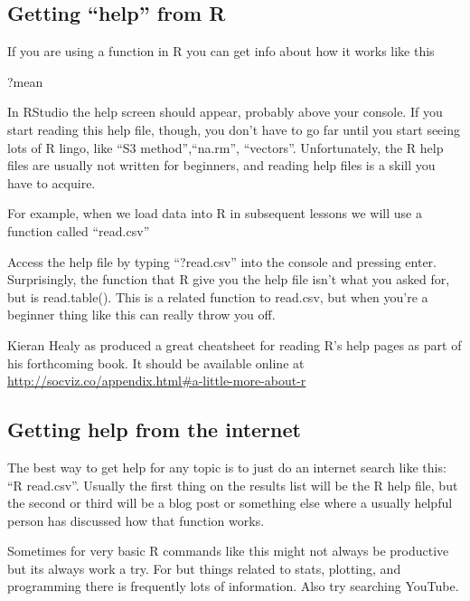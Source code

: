 \documentclass[
]{book}
\newenvironment{Shaded}{\begin{snugshade}}{\end{snugshade}}
\newcommand{\NormalTok}[1]{#1}
\begin{document}
\hypertarget{getting-help-from-r}{%
\subsection{Getting ``help'' from R}\label{getting-help-from-r}}

If you are using a function in R you can get info about how it works like this

\begin{Shaded}
\begin{Highlighting}[]
\NormalTok{?mean}
\end{Highlighting}
\end{Shaded}

In RStudio the help screen should appear, probably above your console. If you start reading this help file, though, you don't have to go far until you start seeing lots of R lingo, like ``S3 method'',``na.rm'', ``vectors''. Unfortunately, the R help files are usually not written for beginners, and reading help files is a skill you have to acquire.

For example, when we load data into R in subsequent lessons we will use a function called ``read.csv''

Access the help file by typing ``?read.csv'' into the console and pressing enter. Surprisingly, the function that R give you the help file isn't what you asked for, but is read.table(). This is a related function to read.csv, but when you're a beginner thing like this can really throw you off.

Kieran Healy as produced a great cheatsheet for reading R's help pages as part of his forthcoming book. It should be available online at \url{http://socviz.co/appendix.html\#a-little-more-about-r}

\hypertarget{getting-help-from-the-internet}{%
\subsection{Getting help from the internet}\label{getting-help-from-the-internet}}

The best way to get help for any topic is to just do an internet search like this: ``R read.csv''. Usually the first thing on the results list will be the R help file, but the second or third will be a blog post or something else where a usually helpful person has discussed how that function works.

Sometimes for very basic R commands like this might not always be productive but its always work a try. For but things related to stats, plotting, and programming there is frequently lots of information. Also try searching YouTube.
\end{document}
